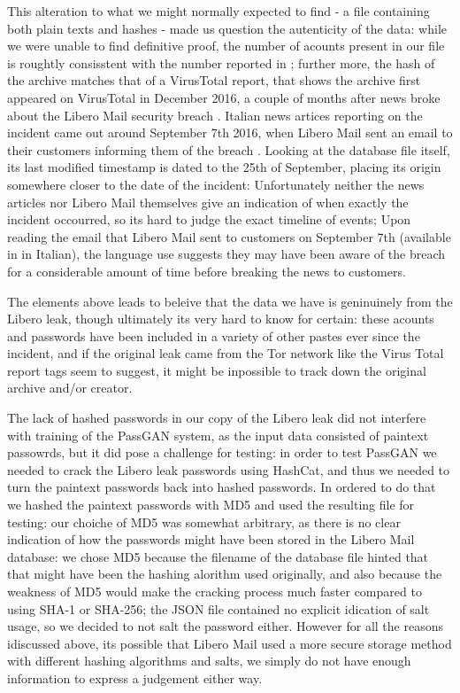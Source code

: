 This alteration to what we might normally expected to find - a file containing both plain texts and hashes - made us question the autenticity of the data: while we were unable to find definitive proof, the number of acounts present in our file is roughtly consisstent with the number reported in \cite{libero_leak}; further more, the hash of the archive matches that of a VirusTotal report, that shows the archive first appeared on VirusTotal in December 2016, a couple of months after news broke about the Libero Mail security breach \cite{virus_total}.
Italian news artices reporting on the incident came out around September  7th 2016, when Libero Mail sent an email to their customers informing them of the breach \cite{libero-news-wired,libero-news-tomhw,libero-news-fanpage}.
Looking at the database file itself, its last modified timestamp is dated to the 25th of September, placing its origin somewhere closer to the date of the incident: Unfortunately neither the news articles nor Libero Mail themselves give an indication of when exactly the incident occourred, so its hard to judge the exact timeline of events; Upon reading the email that Libero Mail sent to customers on September 7th (available in \cite{libero-news-fanpage} in Italian), the language use suggests they may have been aware of the breach for a considerable amount of time before breaking the news to customers.

The elements above leads to beleive that the data we have is geninuinely from the Libero leak, though ultimately its very hard to know for certain: these acounts and passwords have been included in a variety of other pastes ever since the incident, and if the original leak came from the Tor network like the Virus Total report tags seem to suggest, it might be inpossible to track down the original archive and/or creator.

The lack of hashed passwords in our copy of the Libero leak did not interfere with training of the PassGAN system, as the input data consisted of paintext passowrds, but it did pose a challenge for testing: in order to test PassGAN we needed to crack the Libero leak passwords using HashCat, and thus we needed to turn the paintext passwords back into hashed passwords.
In ordered to do that we hashed the paintext passwords with MD5 and used the resulting file for testing: our choiche of MD5 was somewhat arbitrary, as there is no clear indication of how the passwords might have been stored in the Libero Mail database: we chose MD5 because the filename of the database file hinted that that might have been the hashing alorithm used originally, and also because the weakness of MD5 would make the cracking process much faster compared to using SHA-1 or SHA-256; the JSON file contained no explicit idication of salt usage, so we decided to not salt the password either. However for all the reasons idiscussed above, its possible that Libero Mail used a more secure storage method with different hashing algorithms and salts, we simply do not have enough information to express a judgement either way.

